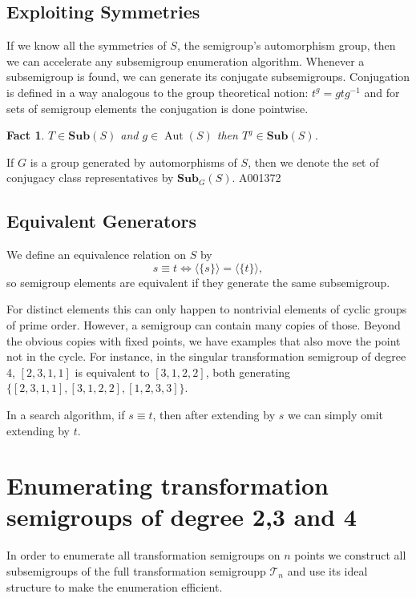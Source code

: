 \documentclass{amsart}
\newcommand{\cT}{{\mathcal T}}
\newcommand{\Sub}{\mathbf{Sub}}
\DeclareMathOperator{\Aut}{Aut}
\theoremstyle{plain}
\newtheorem{fact}[theorem]{Fact}
\theoremstyle{definition}
\begin{document}
\subsection{Exploiting Symmetries}
If we know all the symmetries of $S$, the semigroup's automorphism group, then we can accelerate any subsemigroup enumeration algorithm.
Whenever a subsemigroup is found, we can generate its conjugate subsemigroups.
Conjugation is defined in a way analogous to the group theoretical notion: $t^g=gtg^{-1}$ and for sets of semigroup elements the conjugation is done pointwise.
 
\begin{fact}
$T\in\Sub(S)$ and $g\in \Aut(S)$ then $T^g\in\Sub(S)$.%
\end{fact}

If $G$ is a group generated by automorphisms of $S$, then we denote the set of conjugacy class representatives by $\Sub_G(S)$. A001372


\subsection{Equivalent Generators}
\label{sec:equivgen}
We define an equivalence relation on $S$ by
$$ s\equiv t \Longleftrightarrow \langle\{s\} \rangle= \langle\{t\} \rangle,$$
so semigroup elements are equivalent if they generate the same subsemigroup.

For distinct elements this can only happen to nontrivial elements of cyclic groups of prime order.
However, a semigroup can contain many copies of those.
Beyond the obvious copies with fixed points, we have examples that also move the point not in the cycle. For instance, in the singular transformation semigroup of degree 4, $[ 2, 3, 1, 1 ]$ is equivalent to  $[ 3, 1, 2, 2 ]$, both generating $\{ [ 2, 3, 1, 1 ], [ 3, 1, 2, 2 ], [ 1, 2, 3, 3 ]\}$.

In a search algorithm, if $s\equiv t$, then after extending by $s$ we can simply omit extending by $t$.

\section{Enumerating transformation semigroups of degree 2,3 and 4}
\label{sec:fulltranssgp}

In order to enumerate all transformation semigroups on $n$ points we construct all subsemigroups of the full transformation semigroupp $\cT_n$ and use its ideal structure to make the enumeration efficient.
\end{document}
